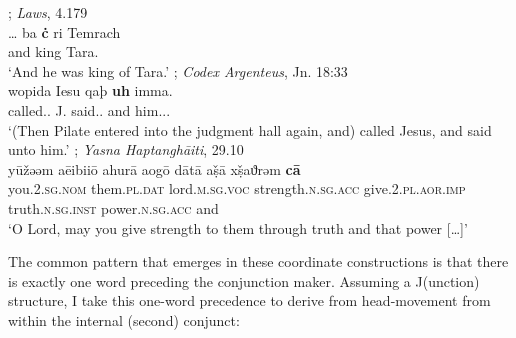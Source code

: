 \documentclass[output=paper]{langsci/langscibook}
\begin{document}
\begin{exe}
    \ex {}; \emph{Laws}, 4.179 \parencite{thurneysen:2003dq}\\
    \gll \ldots{} ba  \textbf{{\.{c}}}  ri Temrach \\
    {} \Cop{} and king Tara.\Gen{} \\
	\trans `And he was king of Tara.'\label{oir}
    \ex {}; \emph{Codex Argenteus}, Jn. 18:33\\
    \gll wopida Iesu qa{þ} \textbf{{uh}} imma. \\
	called.\Prt.\Tsg{} J.\Acc{} said.\Prt.\Tsg{} and him.\M.\Dat.\Sg{} \\
    \trans `(Then Pilate entered into the judgment hall again, and) called Jesus, and said unto him.'\label{got}
    \ex {}; \emph{Yasna Haptanghāiti}, 29.10\\
    \gll yūžəəm aēibiiō ahur{ā}  aog{ō} d{ā}t{ā} a{\d{š}}{ā} x{\d{š}}aϑrəm \textbf{{c{ā}}} \\
    you.\textsc{2.sg.nom} them.\textsc{pl.dat} lord.\textsc{m.sg.voc} strength.\textsc{n.sg.acc} give.\textsc{2.pl.aor.imp} truth.\textsc{n.sg.inst} power.\textsc{n.sg.acc} and \\
    \trans	`O Lord, may you give strength to them through truth and that power [\ldots]' \\
\label{avs}
\end{exe}

The common pattern that emerges in these coordinate
constructions is that
there is exactly one word preceding the conjunction maker. Assuming a
J(unction) structure, I take this one-word precedence to derive from
head-movement from within the internal (second) conjunct:

\begin{exe}
\ex
\end{exe}
\end{document}
